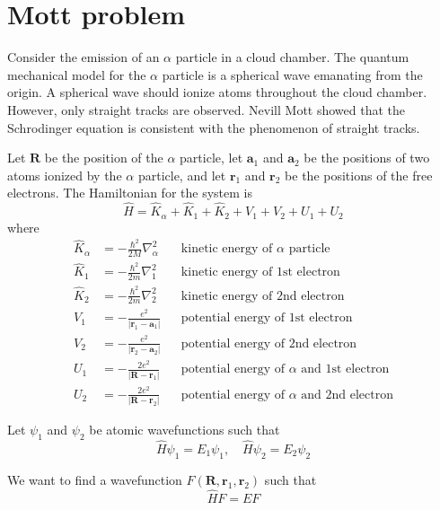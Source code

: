 \documentclass[12pt]{article}
\begin{document}
\section*{Mott problem}

Consider the emission of an $\alpha$ particle in a cloud chamber.
The quantum mechanical model for the $\alpha$ particle is a spherical wave emanating from the origin.
A spherical wave should ionize atoms throughout the cloud chamber.
However, only straight tracks are observed.
Nevill Mott showed that the Schrodinger equation is consistent with the phenomenon of straight tracks.

\bigskip

Let $\mathbf R$ be the position of the $\alpha$ particle,
let $\mathbf a_1$ and $\mathbf a_2$ be the positions of two atoms ionized by the $\alpha$ particle,
and let $\mathbf r_1$ and $\mathbf r_2$ be the positions of the free electrons.
The Hamiltonian for the system is
\begin{equation*}
\hat H=\hat K_\alpha+\hat K_1+\hat K_2+V_1+V_2+U_1+U_2
\end{equation*}
where
\begin{align*}
\hat K_\alpha&=-\frac{\hbar^2}{2M}\nabla_\alpha^2 & & \text{kinetic energy of $\alpha$ particle}
\\[1ex]
\hat K_1&=-\frac{\hbar^2}{2m}\nabla_1^2 & & \text{kinetic energy of 1st electron}
\\[1ex]
\hat K_2&=-\frac{\hbar^2}{2m}\nabla_2^2 & & \text{kinetic energy of 2nd electron}
\\[1ex]
V_1&=-\frac{e^2}{|\mathbf r_1-\mathbf a_1|} & & \text{potential energy of 1st electron}
\\[1ex]
V_2&=-\frac{e^2}{|\mathbf r_2-\mathbf a_2|} & & \text{potential energy of 2nd electron}
\\[1ex]
U_1&=-\frac{2e^2}{|\mathbf R-\mathbf r_1|} & & \text{potential energy of $\alpha$ and 1st electron}
\\[1ex]
U_2&=-\frac{2e^2}{|\mathbf R-\mathbf r_2|} & & \text{potential energy of $\alpha$ and 2nd electron}
\end{align*}

Let $\psi_1$ and $\psi_2$ be atomic wavefunctions such that
\begin{equation*}
\hat H\psi_1=E_1\psi_1,
\quad
\hat H\psi_2=E_2\psi_2
\end{equation*}

We want to find a wavefunction $F(\mathbf R,\mathbf r_1,\mathbf r_2)$ such that
\begin{equation*}
\hat HF=EF
\end{equation*}
\end{document}
